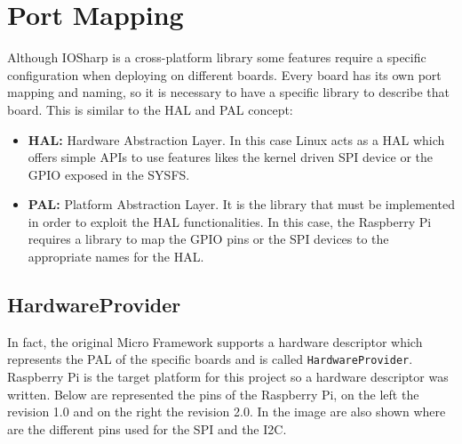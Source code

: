 \section{Port Mapping}\label{S:Port-Mapping}
Although IOSharp is a cross-platform library some features require a specific configuration when deploying on different boards. Every board has its own port mapping and naming, so it is necessary to have a specific library to describe that board. This is similar to the \gls{HAL} and \gls{PAL} concept:
\begin{itemize}
\item \textbf{HAL:} Hardware Abstraction Layer. In this case Linux acts as a HAL which offers simple APIs to use features likes the kernel driven SPI device or the GPIO exposed in the SYSFS.
\item \textbf{PAL:} Platform Abstraction Layer. It is the library that must be implemented in order to exploit the HAL functionalities. In this case, the Raspberry Pi requires a library to map the GPIO pins or the SPI devices to the appropriate names for the HAL.
\end{itemize}

\subsection{HardwareProvider}\label{SS:HardwareProvider}
In fact, the original Micro Framework supports a hardware descriptor which represents the \gls{PAL} of the specific boards and is called \verb!HardwareProvider!. Raspberry Pi is the target platform for this project so a hardware descriptor was written. Below are represented the pins of the Raspberry Pi, on the left the revision 1.0 and on the right the revision 2.0. In the image are also shown where are the different pins used for the SPI and the \gls{I2C}.

